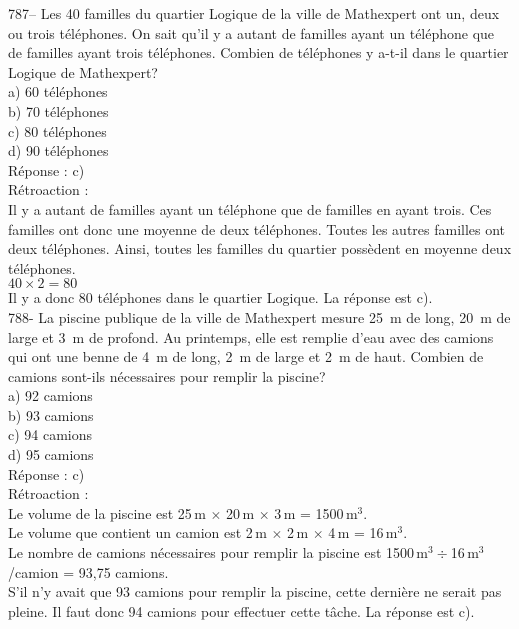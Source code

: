 ﻿\documentclass[letterpaper, 12pt]{article}
\begin{document}
787-- Les 40 familles du quartier Logique de la ville de Mathexpert ont un,
deux ou trois t\'el\'ephones.  On sait qu'il y a autant de familles ayant un
t\'el\'ephone que de familles ayant trois t\'el\'ephones.  Combien de
t\'el\'ephones y a-t-il dans le quartier Logique de Mathexpert?\\
a) 60 t\'el\'ephones\\
b) 70 t\'el\'ephones\\
c) 80 t\'el\'ephones\\
d) 90 t\'el\'ephones\\

R\'eponse : c)\\

R\'etroaction : \\
Il y a autant de familles ayant un t\'el\'ephone que de familles en ayant
trois.  Ces familles ont donc une moyenne de deux t\'el\'ephones.  Toutes
les autres familles ont deux t\'el\'ephones.  Ainsi, toutes les familles du
quartier poss\`edent en moyenne deux t\'el\'ephones.  \\
$40\times2=80$\\
Il y a donc 80 t\'el\'ephones dans le quartier Logique.  La r\'eponse est
c).\\

788- La piscine publique de la ville de Mathexpert mesure 25~m de long, 20~m
de large et 3~m de profond.  Au printemps, elle est remplie d'eau avec des
camions qui ont une benne de 4~m de long, 2~m de large et 2~m de haut.
Combien de camions sont-ils n\'ecessaires pour remplir la piscine?\\
a) 92 camions\\
b) 93 camions\\
c) 94 camions\\
d) 95 camions\\

R\'eponse : c)\\

R\'etroaction : \\
Le volume de la piscine est 25\,m $\times$ 20\,m $\times$ 3\,m =
1500\,m$^{3}$.\\
Le volume que contient un camion est 2\,m $\times$ 2\,m $\times$ 4\,m =
16\,m$^{3}$.\\
Le nombre de camions n\'ecessaires pour remplir la piscine est
1500\,m$^{3}\div$16\,m$^{3}$/camion = 93,75 camions.\\
S'il n'y avait que 93 camions pour remplir la piscine, cette derni\`ere ne
serait pas pleine. Il faut donc 94 camions pour effectuer cette t\^ache. La
r\'eponse est c).\\
\end{document}
